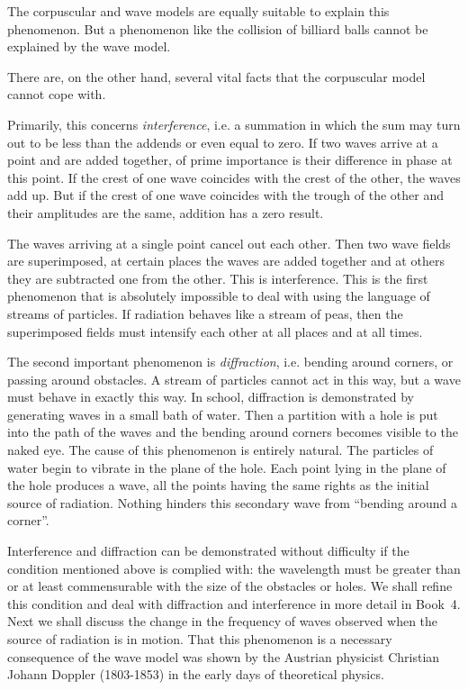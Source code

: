 The corpuscular and wave models are equally suitable to explain this phenomenon. But a phenomenon like the collision of billiard balls cannot be explained by the wave model.

There are, on the other hand, several vital facts that the corpuscular model cannot cope with.

Primarily, this concerns \emph{interference}, i.e. a summation in which the sum may turn out to be less than the addends or even equal to zero. If two waves arrive at a point and are added together, of prime importance is their difference in phase at this point. If the crest of one wave coincides with the crest of the other, the waves add up. But if the crest of one wave coincides with the trough of the other and their amplitudes are the same, addition has a zero result. 

The waves arriving at a single point cancel out each other. Then two wave fields are superimposed, at certain places the waves are added together and at others they are subtracted one from the other. This is interference. This is the first phenomenon that is absolutely impossible to deal with using the language of streams of particles. If radiation behaves like a stream of peas, then the superimposed fields must intensify each other at all places and at all times.

The second important phenomenon is \emph{diffraction}, i.e. bending around corners, or passing around obstacles. A stream of particles cannot act in this way, but a wave must behave in exactly this way. In school, diffraction is demonstrated by generating waves in a small bath of water. Then a partition with a hole is put into the path of the waves and the bending around corners becomes visible to the naked eye. The cause of this phenomenon is entirely natural. The particles of water begin to vibrate in the plane of the hole. Each point lying in the plane of the hole produces a wave, all the points having the same rights as the initial source of radiation. Nothing hinders this secondary wave from ``bending around a corner''.

Interference and diffraction can be demonstrated without difficulty if the condition mentioned above is complied with: the wavelength must be greater than or at least commensurable with the size of the obstacles or holes. We shall refine this condition and deal with diffraction and interference in more detail in Book~4.
Next we shall discuss the change in the frequency of waves observed when the source of radiation is in motion. That this phenomenon is a necessary consequence of the wave model was shown by the Austrian physicist Christian Johann Doppler (1803-1853) in the early days of theoretical physics.

